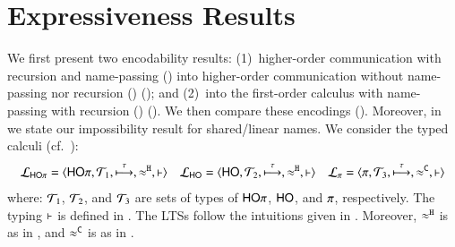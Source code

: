 \documentclass[runningheads]{llncs}
\begin{document}
{\section{Expressiveness Results}
\label{sec:positive}
%
 We first present two encodability results:
(1)~higher-order communication with recursion and name-passing   (\HOp) into 
higher-order communication without name-passing nor recursion (\HO) (); and 
(2)~\HOp into the first-order calculus with name-passing  
with recursion (\sessp) ().
We then compare these  encodings (). 
Moreover, in  we state our impossibility result for shared/linear names.
We consider the typed calculi (cf.~):
	$$\mathcal{L}_{\mathsf{HO}\pi}=\langle \mathsf{HO}\pi, {\cal{T}}_1, \stackrel{\tau}{\longmapsto}, \approx^\mathtt{H}, \vdash \rangle
	\quad
	\mathcal{L}_{\mathsf{HO}}=\langle \mathsf{HO}, {\cal{T}}_2, \stackrel{\tau}{\longmapsto}, \approx^\mathtt{H}, \vdash \rangle
	\quad
	\mathcal{L}_{\pi}=\langle \pi, {\cal{T}}_3, \stackrel{\tau}{\longmapsto}, \approx^\mathtt{C}, \vdash \rangle$$
where: 
${\cal{T}}_1$, ${\cal{T}}_2$, 
and ${\cal{T}}_3$
are sets of types of $\mathsf{HO}\pi$, $\mathsf{HO}$, and $\pi$, respectively. 
The typing $\vdash$ is defined in 
.
The LTSs follow the intuitions given in .
Moreover, 
$\approx^\mathtt{H}$ is as in , and 
$\approx^\mathtt{C}$ is as in .


}
\end{document}
